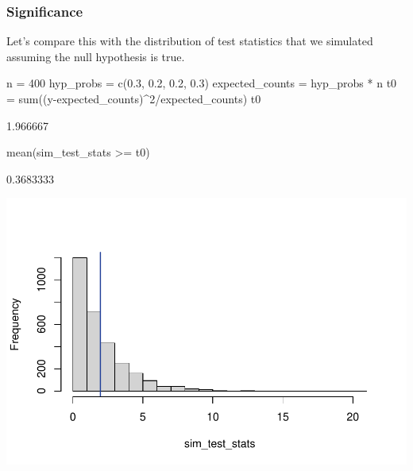 \documentclass[a4paper]{article}
\begin{document}
\subsubsection{Significance}
Let's compare this with the distribution of test statistics that we simulated assuming the null hypothesis is true.
\begin{Schunk}
\begin{Sinput}
n = 400
hyp_probs = c(0.3, 0.2, 0.2, 0.3)
expected_counts  = hyp_probs * n
t0 = sum((y-expected_counts)^2/expected_counts)
t0
\end{Sinput}
\begin{Soutput}
[1] 1.966667
\end{Soutput}
\begin{Sinput}
mean(sim_test_stats >= t0)
\end{Sinput}
\begin{Soutput}
[1] 0.3683333
\end{Soutput}


{\centering \includegraphics[width=\maxwidth]{figure/listings-unnamed-chunk-28-1} 

}

\end{Schunk}
\end{document}

